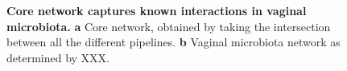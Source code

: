   \begin{figure}[h]
    \begin{center}
      \caption{\textbf{Core network captures known interactions in vaginal microbiota.} \textbf{a} Core network, obtained by taking the intersection between all the different pipelines. \textbf{b} Vaginal microbiota network as determined by XXX.}
      \label{fig:network_comparison}
    \end{center}
  \end{figure}


